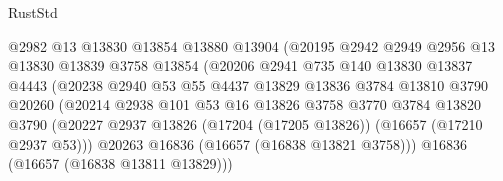 \begin{lexlean}{RustStd}
\begin{coremodule}
                                    @2982
                                    @13
                                    @13830
                                    @13854
                                    @13880
                                    @13904
                                    (@20195
                                      @2942
                                      @2949
                                      @2956
                                      @13
                                      @13830
                                      @13839
                                      @3758
                                      @13854
                                      (@20206
                                        @2941
                                        @735
                                        @140
                                        @13830
                                        @13837
                                        @4443
                                        (@20238
                                          @2940
                                          @53
                                          @55
                                          @4437
                                          @13829
                                          @13836
                                          @3784
                                          @13810
                                          @3790
                                          @20260
                                          (@20214
                                            @2938
                                            @101
                                            @53
                                            @16
                                            @13826
                                            @3758
                                            @3770
                                            @3784
                                            @13820
                                            @3790
                                            (@20227
                                              @2937
                                              @13826
                                              (@17204 (@17205 @13826))
                                              (@16657 (@17210 @2937 @53)))
                                            @20263
                                            @16836
                                            (@16657 (@16838 @13821 @3758)))
                                          @16836
                                          (@16657 (@16838 @13811 @13829)))

\end{coremodule}
\end{lexlean}
